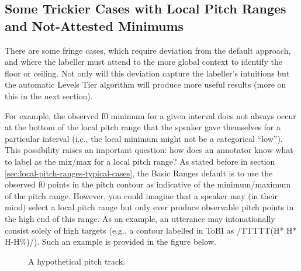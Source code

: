 \documentclass[11pt, twoside]{memoir}
\begin{document}
\subsection{Some Trickier Cases with Local Pitch Ranges and Not-Attested Minimums}\label{sec:some-trickier-cases-with-local-pitch-ranges}

There are some fringe cases, which require deviation from the default approach, and where the labeller must attend to the more global context to identify the floor or ceiling. Not only will this deviation capture the labeller’s intuitions but the automatic Levels Tier algorithm will produce more useful results (more on this in the next section).

For example, the observed f0 minimum for a given interval does not always occur at the bottom of the local pitch range that the speaker gave themselves for a particular interval (i.e., the local minimum might not be a categorical “low”). This possibility raises an important question: how does an annotator know what to label as the mix\slash max for a local pitch range? As stated before in section \ref{sec:local-pitch-ranges-typical-cases}, the Basic Ranges default is to use the observed f0 points in the pitch contour as indicative of the minimum\slash maximum of the pitch range. However, you could imagine that a speaker may (in their mind) select a local pitch range but only ever produce observable pitch points in the high end of this range. As an example, an utterance may intonationally consist solely of high targets (e.g., a contour labelled in ToBI as /TTTTT(H* H* H-H\%)/). Such an example is provided in the figure below.

\begin{figure}[H]
\centering
{}
\caption{A hypothetical pitch track.%
\label{fig:ranges-what-if3 Ranges Adv}%
}
\end{figure}
\end{document}
